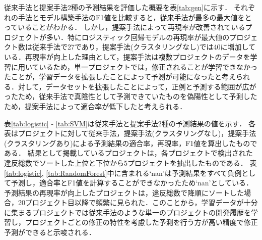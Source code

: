 \documentclass[11pt,dvipdfmx]{jreport}
\begin{document}
\begin{table}{}
    \centering
    \caption{ロジスティック回帰モデルで再現率とF1値が向上した予測結果}
    \label{tab:log-super}
    \vspace{3mm}
\end{table}


従来手法と提案手法2種の予測結果を評価した概要を表\ref{tab:gen}に示す．
それぞれの手法とモデル構築手法のF1値を比較すると，従来手法が最多の最大値をとっていることがわかる．
しかし，提案手法によって再現率が改善されているプロジェクトが多い．特にロジスティック回帰モデルの再現率が最大値のプロジェクト数は従来手法で27であり，提案手法(クラスタリングなし)では40に増加している．再現率が向上した理由として，提案手法は複数プロジェクトのデータを学習に用いているため，単一プロジェクトでは，修正されることが学習できなかったことが，学習データを拡張したことによって予測が可能になったと考えられる．対して，データセットを拡張したことによって，正例と予測する範囲が広がったため，従来手法で真陰性として予測できていたものを偽陽性として予測したため，提案手法によって適合率が低下したと考えられる．

表\ref{tab:logistic} - \ref{tab:SVM}は従来手法と提案手法2種の予測結果の値を示す．
各表はプロジェクトに対して従来手法，提案手法(クラスタリングなし)，提案手法(クラスタリングあり)による予測結果の適合率，再現率，F1値を算出したものである．
結果として掲載しているプロジェクトは，各プロジェクトで検出された違反総数でソートした上位と下位から5プロジェクトを抽出したものである．
表\ref{tab:logistic}, \ref{tab:RandomForest}中に含まれる`nan'は予測結果をすべて負例として予測し，適合率とF1値を計算することができなかったため`nan'としている．
予測結果の再現率が向上したプロジェクトは，違反総数で降順にソートした場合，20プロジェクト目以降で頻繁に見られた．このことから，学習データが十分に集まるプロジェクトでは従来手法のような単一のプロジェクトの開発履歴を学習し，プロジェクトごとの修正の特性を考慮した予測を行う方が高い精度で修正予測ができると示唆される．
\end{document}
